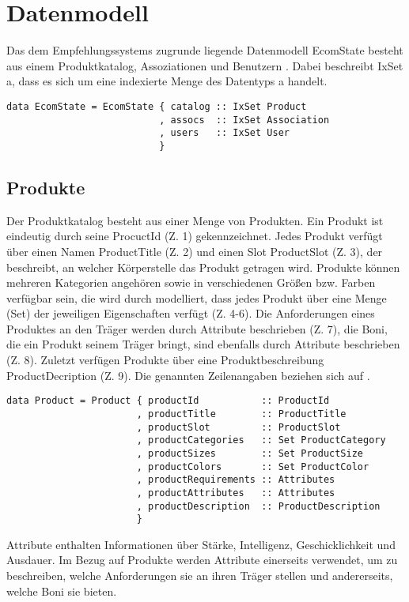 \chapter{Datenmodell}
Das dem Empfehlungssystems zugrunde liegende Datenmodell \textsf{EcomState} besteht aus einem Produktkatalog, Assoziationen und Benutzern . Dabei beschreibt \textsf{IxSet a}, dass es sich um eine indexierte Menge des Datentyps \textsf{a} handelt.

\begin{lstlisting}[label=code:EcomState,caption=Struktur von \textsf{EcomState}]
data EcomState = EcomState { catalog :: IxSet Product
                           , assocs  :: IxSet Association
                           , users   :: IxSet User
                           }
\end{lstlisting}
\vspace*{-1em}


\section{Produkte}
Der Produktkatalog besteht aus einer Menge von Produkten. Ein Produkt ist eindeutig durch seine \textsf{ProcuctId} (Z. 1) gekennzeichnet. Jedes Produkt verfügt über einen Namen \textsf{ProductTitle} (Z. 2) und einen Slot \textsf{ProductSlot} (Z. 3), der beschreibt, an welcher Körperstelle das Produkt getragen wird. Produkte können mehreren Kategorien angehören sowie in verschiedenen Größen bzw. Farben verfügbar sein, die wird durch modelliert, dass jedes Produkt über eine Menge (\textsf{Set}) der jeweiligen Eigenschaften verfügt (Z. 4-6). Die Anforderungen eines Produktes an den Träger werden durch Attribute beschrieben (Z. 7), die Boni, die ein Produkt seinem Träger bringt, sind ebenfalls durch Attribute beschrieben (Z. 8). Zuletzt verfügen Produkte über eine Produktbeschreibung \textsf{ProductDecription} (Z. 9). Die genannten Zeilenangaben beziehen sich auf .

\begin{lstlisting}[label=code:Product,caption=Struktur von \textsf{Product}]
data Product = Product { productId           :: ProductId
                       , productTitle        :: ProductTitle
                       , productSlot         :: ProductSlot
                       , productCategories   :: Set ProductCategory
                       , productSizes        :: Set ProductSize
                       , productColors       :: Set ProductColor
                       , productRequirements :: Attributes
                       , productAttributes   :: Attributes
                       , productDescription  :: ProductDescription
                       }
\end{lstlisting}
Attribute enthalten Informationen über Stärke, Intelligenz, Geschicklichkeit und Ausdauer. Im Bezug auf Produkte werden Attribute einerseits verwendet, um zu be\-schrei\-ben, welche Anforderungen sie an ihren Träger stellen und andererseits, welche Boni sie bie\-ten.

